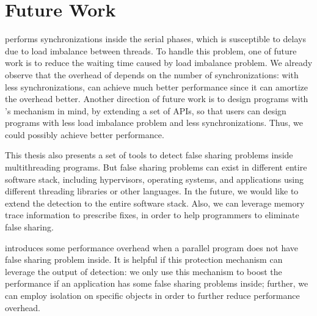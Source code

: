 \section{Future Work}

\dthreads{} performs synchronizations inside the serial phases, which is susceptible to delays due to load imbalance between threads. To handle this problem, one of future work is to reduce the waiting time caused by load imbalance problem. We already observe that the overhead of \dthreads{} depends on the number of synchronizations: with less synchronizations, \dthreads{} can achieve much better performance since it can amortize the overhead better.  Another direction of future work is to design programs with \dthreads{}'s mechanism in mind, by extending a set of APIs, so that users can design programs with less load imbalance problem and less synchronizations. Thus, we could possibly achieve better performance. 

This thesis also presents a set of tools to detect false sharing problems inside multithreading programs. But false sharing problems can exist in different entire software stack, including hypervisors, operating systems, and applications using different threading libraries or other languages. In the future, we would like to extend the detection to the entire software stack. Also, we can leverage memory trace information to prescribe fixes, in order to help programmers to eliminate false sharing.

\SheriffProtect{} introduces some performance overhead when a parallel program does not have false sharing problem inside. It is helpful if this protection mechanism can leverage the output of detection: we only use this mechanism to boost the performance if an application has some false sharing problems inside; further, we can employ isolation on specific objects in order to further reduce performance overhead.  